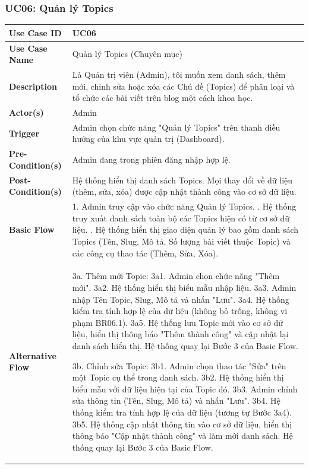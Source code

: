 \documentclass[a4paper,12pt]{article}
\begin{document}
\subsubsection{UC06: Quản lý Topics}
\begin{longtable}{|p{4cm}|p{11.5cm}|}
\hline
\textbf{Use Case ID} & UC06 \\ \hline
\textbf{Use Case Name} & Quản lý Topics (Chuyên mục) \\ \hline
\textbf{Description} & Là Quản trị viên (Admin), tôi muốn xem danh sách, thêm mới, chỉnh sửa hoặc xóa các Chủ đề (Topics) để phân loại và tổ chức các bài viết trên blog một cách khoa học. \\ \hline
\textbf{Actor(s)} & Admin \\ \hline
\textbf{Trigger} & Admin chọn chức năng "Quản lý Topics" trên thanh điều hướng của khu vực quản trị (Dashboard). \\ \hline
\textbf{Pre-Condition(s)} & Admin đang trong phiên đăng nhập hợp lệ. \\ \hline
\textbf{Post-Condition(s)} & Hệ thống hiển thị danh sách Topics. Mọi thay đổi về dữ liệu (thêm, sửa, xóa) được cập nhật thành công vào cơ sở dữ liệu. \\ \hline
\textbf{Basic Flow} & 
1. Admin truy cập vào chức năng Quản lý Topics. \newline
2. Hệ thống truy xuất danh sách toàn bộ các Topics hiện có từ cơ sở dữ liệu. \newline
3. Hệ thống hiển thị giao diện quản lý bao gồm danh sách Topics (Tên, Slug, Mô tả, Số lượng bài viết thuộc Topic) và các công cụ thao tác (Thêm, Sửa, Xóa). \\ \hline
\textbf{Alternative Flow} & 
3a. Thêm mới Topic: \newline
3a1. Admin chọn chức năng "Thêm mới". \newline
3a2. Hệ thống hiển thị biểu mẫu nhập liệu. \newline
3a3. Admin nhập Tên Topic, Slug, Mô tả và nhấn "Lưu". \newline
3a4. Hệ thống kiểm tra tính hợp lệ của dữ liệu (không bỏ trống, không vi phạm BR06.1). \newline
3a5. Hệ thống lưu Topic mới vào cơ sở dữ liệu, hiển thị thông báo "Thêm thành công" và cập nhật lại danh sách hiển thị. \newline
Hệ thống quay lại Bước 3 của Basic Flow. \newline

3b. Chỉnh sửa Topic: \newline
3b1. Admin chọn thao tác "Sửa" trên một Topic cụ thể trong danh sách. \newline
3b2. Hệ thống hiển thị biểu mẫu với dữ liệu hiện tại của Topic đó. \newline
3b3. Admin chỉnh sửa thông tin (Tên, Slug, Mô tả) và nhấn "Lưu". \newline
3b4. Hệ thống kiểm tra tính hợp lệ của dữ liệu (tương tự Bước 3a4). \newline
3b5. Hệ thống cập nhật thông tin vào cơ sở dữ liệu, hiển thị thông báo "Cập nhật thành công" và làm mới danh sách. \newline
Hệ thống quay lại Bước 3 của Basic Flow. \newline


\end{longtable}
\end{document}
